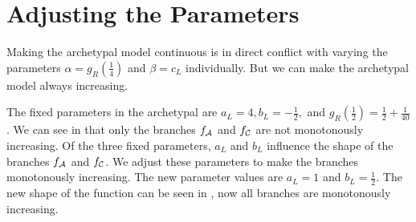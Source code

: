 \section{Adjusting the Parameters}
\label{sec:add.parameters}

Making the archetypal model continuous is in direct conflict with varying the parameters $\alpha = g_R\left(\frac{1}{4}\right)$ and $\beta = c_L$ individually.
But we can make the archetypal model always increasing.

The fixed parameters in the archetypal are $a_L = 4, b_L = -\frac{1}{2},$ and $g_R\left(\frac{1}{2}\right) = \frac{1}{2} + \frac{1}{40}$.
We can see in  that only the branches $f_{\mathcal{A}}$ and $f_{\mathcal{C}}$ are not monotonously increasing.
Of the three fixed parameters, $a_L$ and $b_L$ influence the shape of the branches $f_{\mathcal{A}}$ and $f_{\mathcal{C}}$.
We adjust these parameters to make the branches monotonously increasing.
The new parameter values are $a_L = 1$ and $b_L = \frac{1}{2}$.
The new shape of the function can be seen in , now all branches are monotonously increasing.

